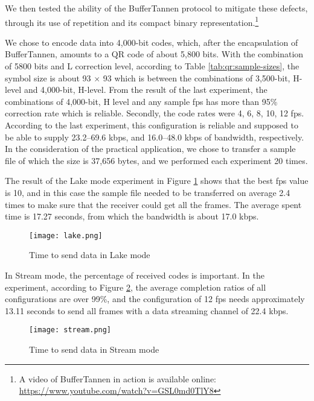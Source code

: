 We then tested the ability of the BufferTannen protocol to mitigate these defects, through its use of repetition and its compact binary representation.\footnote{A video of BufferTannen in action is available online: \url{https://www.youtube.com/watch?v=GSL0md0TlY8}}

We chose to encode data into 4,000-bit codes, which, after the encapsulation of BufferTannen, amounts to a QR code of about 5,800 bits. With the combination of 5800 bits and L correction level, according to Table \ref{tab:qr:sample-sizes}, the symbol size is about 93 $\times$ 93 which is between the combinations of 3,500-bit, H-level and 4,000-bit, H-level. From the result of the last experiment, the combinations of 4,000-bit, H level and any sample fps has more than 95\% correction rate which is reliable. Secondly, the code rates were 4, 6, 8, 10, 12 fps. According to the last experiment, this configuration is reliable and supposed to be able to supply 23.2--69.6 kbps, and 16.0--48.0 kbps of bandwidth, respectively.
%
In the consideration of the practical application, we chose to transfer a sample file of which the size is 37,656 bytes, and we performed each experiment 20 times.

The result of the Lake mode experiment in Figure \ref{img-explake} shows that the best fps value is 10, and in this case the sample file needed to be transferred on average 2.4 times to make sure that the receiver could get all the frames. The average spent time is 17.27 seconds, from which the bandwidth is about 17.0 kbps.

\begin{figure}[ht]
\begin{center}
\centering
\texttt{[image: lake.png]}
\caption{Time to send data in Lake mode}
\label{img-explake}
\end{center}
\end{figure}

In Stream mode, the percentage of received codes is important. In the experiment, according to Figure \ref{img-expstream}, the average completion ratios of all configurations are over 99\%, and the configuration of 12 fps needs approximately 13.11 seconds to send all frames with a data streaming channel of 22.4 kbps.

\begin{figure}[ht]
\begin{center}
\centering
\texttt{[image: stream.png]}
\caption{Time to send data in Stream mode}
\label{img-expstream}
\end{center}
\end{figure}

